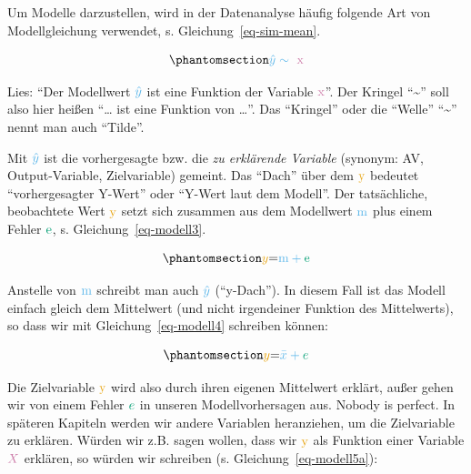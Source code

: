 \documentclass[
  letterpaper,
]{scrbook}
\theoremstyle{definition}
\theoremstyle{definition}
\theoremstyle{definition}
\theoremstyle{remark}
\begin{document}
Um Modelle darzustellen, wird in der Datenanalyse häufig folgende Art
von Modellgleichung verwendet, s. Gleichung~\ref{eq-sim-mean}.

\begin{equation}\phantomsection\label{eq-sim-mean}{\color{modelcol}{\hat{y}} \sim \color{xcol}{\text{ x}}}\end{equation}

Lies: ``Der Modellwert \(\color{modelcol}{\hat{y}}\) ist eine Funktion
der Variable \(\color{xcol}{\text{x}}\)''. Der Kringel
``\textasciitilde{}'' soll also hier heißen ``\ldots{} ist eine Funktion
von \ldots{}''. Das ``Kringel'' oder die ``Welle'' ``\textasciitilde{}''
nennt man auch ``Tilde''.

Mit \(\color{modelcol}{\hat{y}}\) ist die vorhergesagte bzw. die
\emph{zu erklärende Variable} (synonym: AV, Output-Variable,
Zielvariable) gemeint. Das ``Dach'' über dem \(\color{ycol}{\text{y}}\)
bedeutet ``vorhergesagter Y-Wert'' oder ``Y-Wert laut dem Modell''. Der
tatsächliche, beobachtete Wert \(\color{ycol}{\text{y}}\) setzt sich
zusammen aus dem Modellwert \(\color{modelcol}{\text{m}}\) plus einem
Fehler \(\color{errorcol}{\text{e}}\), s. Gleichung~\ref{eq-modell3}.

\begin{equation}\phantomsection\label{eq-modell3}{\color{ycol}{y} \color{black}{ = } \color{modelcol}{\text{m}} + \color{errorcol}{\text{e}}}\end{equation}

Anstelle von \(\color{modelcol}{\text{m}}\) schreibt man auch
\(\color{modelcol}{\hat{y}}\) (``y-Dach''). In diesem Fall ist das
Modell einfach gleich dem Mittelwert (und nicht irgendeiner Funktion des
Mittelwerts), so dass wir mit Gleichung~\ref{eq-modell4} schreiben
können:

\begin{equation}\phantomsection\label{eq-modell4}{\color{ycol}{y}  \color{black}{ = } \color{modelcol}{\bar{x}} + \color{errorcol}{e}}\end{equation}

Die Zielvariable \(\color{ycol}{\text{y}}\) wird also durch ihren
eigenen Mittelwert erklärt, außer gehen wir von einem Fehler
\(\color{errorcol}e\) in unseren Modellvorhersagen aus. Nobody is
perfect. In späteren Kapiteln werden wir andere Variablen heranziehen,
um die Zielvariable zu erklären. Würden wir z.B. sagen wollen, dass wir
\(\color{ycol}{\text{y}}\) als Funktion einer Variable
\(\color{xcol}{X}\) erklären, so würden wir schreiben (s.
Gleichung~\ref{eq-modell5a}):
\end{document}
